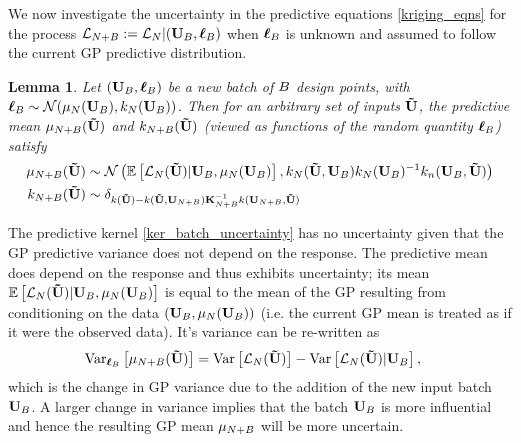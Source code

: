 \documentclass[12pt]{article}
\newtheorem{lemma}{Lemma}
\begin{document}
We now investigate the uncertainty in the predictive equations \ref{kriging_eqns} for the process $\llik_{\Ndesign + \Nbatch} := \llik_{\Ndesign}|(\inputMatBatch, \outputVecBatch)$
when $\outputVecBatch$ is unknown and assumed to follow the current GP predictive distribution. 
\begin{lemma}  \label{lemma_pred_uncertainty}
Let $(\inputMatBatch, \outputVecBatch)$ be a new batch of $\Nbatch$ design points, with 
$\outputVecBatch \sim \Gaussian(\GPMeanPred[\Ndesign](\inputMatBatch), \GPKerPred[\Ndesign](\inputMatBatch))$. Then for an arbitrary set of inputs 
$\newInputMat$, the predictive mean $\GPMeanPred[\Ndesign+\Nbatch](\newInputMat)$ and $\GPKerPred[\Ndesign+\Nbatch](\newInputMat)$
 (viewed as functions of the random quantity $\outputVecBatch$) satisfy 
\begin{align}
\GPMeanPred[\Ndesign+\Nbatch](\newInputMat) 
&\sim \Gaussian\left(\E\left[\llik_{\Ndesign}(\newInputMat)| \inputMatBatch, \GPMeanPred[\Ndesign](\inputMatBatch) \right], 
\GPKerPred[\Ndesign](\newInputMat, \inputMatBatch) \GPKerPred[\Ndesign](\inputMatBatch)^{-1} \GPKerPred(\inputMatBatch, \newInputMat) \right)  \label{mean_batch_uncertainty} \\
\GPKerPred[\Ndesign+\Nbatch](\newInputMat) 
& \sim \delta_{\GPKer(\newInputMat) - \GPKer(\newInputMat, \inputMat[\Ndesign+\Nbatch]) \KerMat[\Ndesign+\Nbatch]^{-1} \GPKer(\inputMat[\Ndesign+\Nbatch], \newInputMat)}  \label{ker_batch_uncertainty}
\end{align}
\end{lemma}
The predictive kernel \ref{ker_batch_uncertainty} has no uncertainty given that the GP predictive variance does not depend on the response. The predictive mean does depend 
on the response and thus exhibits uncertainty; its mean $\E\left[\llik_{\Ndesign}(\newInputMat)| \inputMatBatch, \GPMeanPred[\Ndesign](\inputMatBatch) \right]$ is 
equal to the mean of the GP resulting from conditioning on the data $(\inputMatBatch, \GPMeanPred[\Ndesign](\inputMatBatch))$ (i.e. the current GP mean is treated as if it 
were the observed data). It's variance can be re-written as 
\begin{align*}
\Var_{\outputVecBatch}\left[\GPMeanPred[\Ndesign+\Nbatch](\newInputMat) \right] 
&= \Var\left[\llik_{\Ndesign}(\newInputMat)\right]  - \Var\left[\llik_{\Ndesign}(\newInputMat) | \inputMatBatch  \right],
\end{align*}
which is the change in GP variance due to the addition of the new input batch $\inputMatBatch$. A larger change in variance implies that 
the batch $\inputMatBatch$ is more influential and hence the resulting GP mean $\GPMeanPred[\Ndesign+\Nbatch]$ will be more uncertain. 
\end{document}
